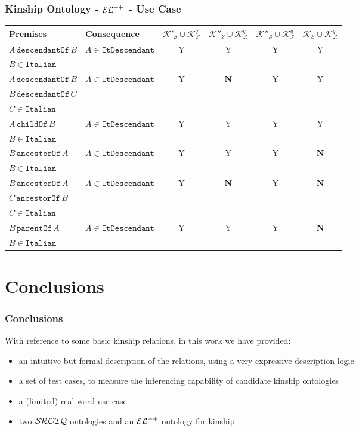 \documentclass[8pt]{beamer}
\newcommand{\child}{\mathtt{childOf}}
\newcommand{\parent}{\mathtt{parentOf}}
\newcommand{\ancestor}{\mathtt{ancestorOf}}
\newcommand{\descendant}{\mathtt{descendantOf}}
\newcommand{\Alice}{A}
\newcommand{\Bob}{B}
\newcommand{\Charlie}{C}
\newcommand{\KBsetsq}{\mathcal{K}^{q}_\mathcal{L}}
\newcommand{\KBtra}{\mathcal{K}'_{\mathcal{S}}}
\newcommand{\KBirr}{\mathcal{K}''_{\mathcal{S}}}
\newcommand{\KBq}{\mathcal{K}^{q}_{\mathcal{S}}}
\newcommand{\KBel}{\mathcal{K_E}}
\newcommand{\italian}{\mathtt{Italian}}
\newcommand{\withitanc}{\mathtt{ItDescendant}}
\newcommand{\testpassed}{\textsf{Y}}
\newcommand{\testfailed}{\bf{\textsf{N}}}
\begin{document}
\begin{frame}
\frametitle{Kinship Ontology - $\mathcal{EL}^{++}$ - Use Case}
\begin{small}
\begin{center}
\begin{tabular}{|l|l|c|c|c|c|}
\hline
\bf{Premises} & \bf{Consequence} & $\KBtra \cup \KBsetsq$ & $\KBirr \cup \KBsetsq$ & $\KBirr \cup \KBq$ & $\KBel \cup \KBsetsq$\\
\hline
  $\Alice\,\descendant\,\Bob$ & $\Alice \in \withitanc$ & \testpassed & \testpassed & \testpassed & \testpassed\\
  $\Bob \in \italian$ & & & & &\\
\hline
  $\Alice\,\descendant\,\Bob$ & $\Alice \in \withitanc$ & \testpassed & \testfailed& \testpassed  & \testpassed\\
  $\Bob\,\descendant\,\Charlie$ & & & & &\\
  $\Charlie \in \italian$ & & & & &\\
\hline
  $\Alice\,\child\,\Bob$ & $\Alice \in \withitanc$ & \testpassed & \testpassed& \testpassed & \testpassed\\
  $\Bob \in \italian$ & & & & &\\
\hline
  $\Bob\,\ancestor\,\Alice$ & $\Alice \in \withitanc$ & \testpassed & \testpassed& \testpassed & \testfailed\\
  $\Bob \in \italian$ & & & & &\\
\hline
  $\Bob\,\ancestor\,\Alice$ & $\Alice \in \withitanc$ & \testpassed & \testfailed & \testpassed & \testfailed\\
  $\Charlie\,\ancestor\,\Bob$ & & & & &\\
  $\Charlie \in \italian$ & & & &&\\
\hline
  $\Bob\,\parent\,\Alice$ & $\Alice \in \withitanc$ & \testpassed & \testpassed & \testpassed & \testfailed\\
  $\Bob \in \italian$ & & & & &\\
\hline
\end{tabular}
\end{center}
\end{small}
\end{frame}

\section{Conclusions}
\begin{frame}
\frametitle{Conclusions}
With reference to some basic kinship relations, in this work we have provided:
\begin{itemize}
 \item an intuitive but formal description of the relations, using a very expressive description logic
 \item a set of test cases, to measure the inferencing capability of candidate kinship ontologies
 \item a (limited) real word use case
 \item two $\mathcal{SROIQ}$ ontologies and an $\mathcal{EL}^{++}$ ontology for kinship
\end{itemize}
\end{frame}
\end{document}
